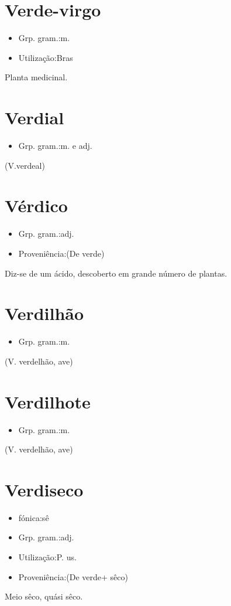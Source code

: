 \documentclass{article}
\begin{document}
\section{Verde-virgo}
\begin{itemize}
\item {Grp. gram.:m.}
\end{itemize}
\begin{itemize}
\item {Utilização:Bras}
\end{itemize}
Planta medicinal.
\section{Verdial}
\begin{itemize}
\item {Grp. gram.:m.  e  adj.}
\end{itemize}
(V.verdeal)
\section{Vérdico}
\begin{itemize}
\item {Grp. gram.:adj.}
\end{itemize}
\begin{itemize}
\item {Proveniência:(De \textunderscore verde\textunderscore )}
\end{itemize}
Diz-se de um ácido, descoberto em grande número de plantas.
\section{Verdilhão}
\begin{itemize}
\item {Grp. gram.:m.}
\end{itemize}
(V. \textunderscore verdelhão\textunderscore , ave)
\section{Verdilhote}
\begin{itemize}
\item {Grp. gram.:m.}
\end{itemize}
(V. \textunderscore verdelhão\textunderscore , ave)
\section{Verdiseco}
\begin{itemize}
\item {fónica:sê}
\end{itemize}
\begin{itemize}
\item {Grp. gram.:adj.}
\end{itemize}
\begin{itemize}
\item {Utilização:P. us.}
\end{itemize}
\begin{itemize}
\item {Proveniência:(De \textunderscore verde\textunderscore  + \textunderscore sêco\textunderscore )}
\end{itemize}
Meio sêco, quási sêco.
\end{document}
